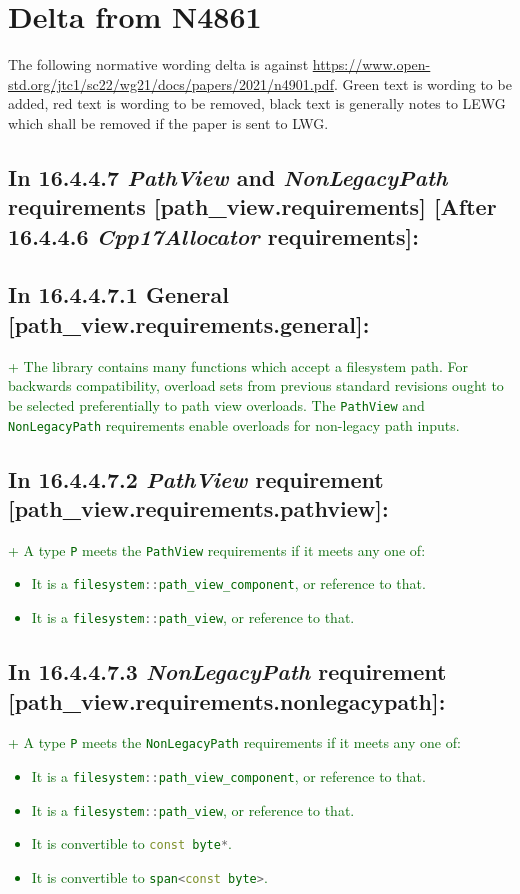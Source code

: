 \documentclass[11pt]{article}
\newcommand{\code}[2][cpp]{\lstinline[language=#1,basicstyle=\small\ttfamily]{#2}}
\newcommand{\tsref}[2]{\subsection*{In #2 \textbf{[#1]}:}}
\newcommand{\tsrefz}[1]{\subsection*{In #1:}}
\newcommand{\tsreplace}[3]{\textcolor{red}{\sout{#1}}#2\textcolor{darkgreen}{#3}}
\begin{document}
\section{Delta from N4861}

The following normative wording delta is against \url{https://www.open-std.org/jtc1/sc22/wg21/docs/papers/2021/n4901.pdf}. Green text is wording to be added, red text is wording to be removed, black text is generally notes to LEWG which shall be removed if the paper is sent to LWG.

\tsref{After 16.4.4.6 \emph{Cpp17Allocator} requirements}{16.4.4.7 \emph{PathView} and \emph{NonLegacyPath} requirements [path\_view.requirements]}

\tsrefz{16.4.4.7.1 General [path\_view.requirements.general]}

\tsreplace{}{}{+ The library contains many functions which accept a filesystem path. For backwards compatibility, overload sets from previous standard revisions ought to be selected preferentially to path view overloads. The \code{PathView} and \code{NonLegacyPath} requirements enable overloads for non-legacy path inputs.}

\tsrefz{16.4.4.7.2 \emph{PathView} requirement [path\_view.requirements.pathview]}

\tsreplace{}{}{+ A type \code{P} meets the \code{PathView} requirements if it meets any one of:
\begin{itemize}
    \item It is a \code{filesystem::path_view_component}, or reference to that.
    \item It is a \code{filesystem::path_view}, or reference to that.
\end{itemize}}

\tsrefz{16.4.4.7.3 \emph{NonLegacyPath} requirement [path\_view.requirements.nonlegacypath]}

\tsreplace{}{}{+ A type \code{P} meets the \code{NonLegacyPath} requirements if it meets any one of:
\begin{itemize}
    \item It is a \code{filesystem::path_view_component}, or reference to that.
    \item It is a \code{filesystem::path_view}, or reference to that.
    \item It is convertible to \code{const byte*}.
    \item It is convertible to \code{span<const byte>}.
\end{itemize}}
\end{document}

